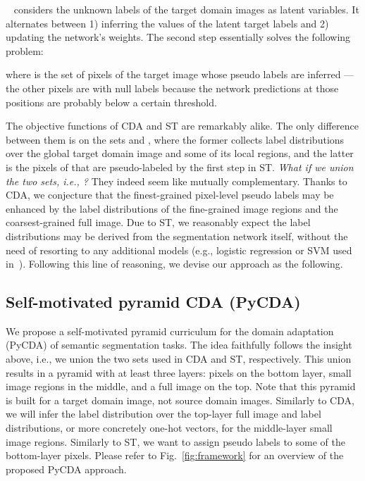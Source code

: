 \documentclass[10pt,twocolumn,letterpaper]{article}
\begin{document}
\vspace{3pt}
~\cite{self_motivated_2018_ECCV} considers the unknown labels of the target domain images as latent variables. It alternates between 1) inferring the values of the latent target labels and 2) updating the network's weights. The second step essentially solves the following problem:

where  is the set of pixels of the target image  whose pseudo labels  are inferred --- the other pixels are with null labels because the network predictions at those positions are probably below a certain threshold.

\vspace{3pt}
The objective functions of CDA and ST are remarkably alike. The only difference between them is on the sets  and , where the former collects label distributions over the global target domain image  and some of its local regions, and the latter is the pixels of  that are pseudo-labeled by the first step in ST. \emph{What if we union the two sets, i.e., ?} They indeed seem like mutually complementary. Thanks to CDA, we conjecture that the finest-grained pixel-level pseudo labels  may be enhanced by the label distributions of the fine-grained image regions and the coarsest-grained full image. Due to ST, we reasonably expect the label distributions may be derived from the segmentation network itself, without the need of resorting to any additional models (e.g., logistic regression or SVM used in~\cite{curriculum_tpami}). Following this line of reasoning, we devise our approach as the following.


\subsection{Self-motivated pyramid CDA (PyCDA)} \label{sec-pyCDA}
We propose a self-motivated pyramid curriculum for the domain adaptation (PyCDA) of semantic segmentation tasks.  The idea faithfully follows the insight above, i.e., we union the two sets  used in CDA and ST, respectively. This union results in a pyramid with at least three layers: pixels on the bottom layer, small image regions in the middle, and a full image on the top. {Note that this pyramid is built for a target domain image, not source domain images.} Similarly to CDA, we will infer the label distribution over the top-layer full image and label distributions, or more concretely one-hot vectors, for the middle-layer small image regions. Similarly to ST, we want to assign pseudo labels to some of the bottom-layer pixels. Please refer to Fig.~\ref{fig:framework} for an overview of the proposed PyCDA approach.
\end{document}
